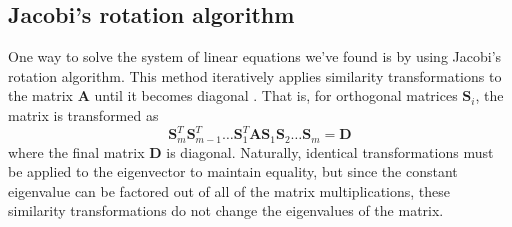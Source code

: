\documentclass[aps,prc,reprint]{revtex4-1}
\begin{document}
    \subsection{Jacobi's rotation algorithm}
    \label{sub:jacobi}
        One way to solve the system of linear equations we've found is by using Jacobi's rotation algorithm. This method iteratively applies similarity transformations to the matrix $\mathbf{A}$ until it becomes diagonal \cite{courserepo}. That is, for orthogonal matrices $\mathbf{S}_i$, the matrix is transformed as
        \begin{equation*}
            \mathbf{S}_m^T \mathbf{S}_{m-1}^T \dots \mathbf{S}_{1}^T \mathbf{A} \mathbf{S}_{1} \mathbf{S}_{2} \dots \mathbf{S}_{m} = \mathbf{D}
        \end{equation*}
        where the final matrix $\mathbf{D}$ is diagonal. Naturally, identical transformations must be applied to the eigenvector to maintain equality, but since the constant eigenvalue can be factored out of all of the matrix multiplications, these similarity transformations do not change the eigenvalues of the matrix. \cite{courserepo}
\end{document}
